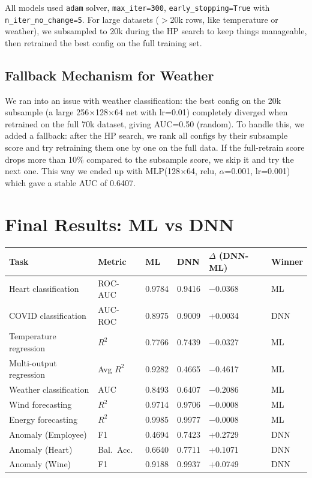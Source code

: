 \documentclass[11pt,a4paper]{article}
\begin{document}
All models used \texttt{adam} solver, \texttt{max\_iter=300}, \texttt{early\_stopping=True} with \texttt{n\_iter\_no\_change=5}.
For large datasets ($>$20k rows, like temperature or weather), we subsampled to 20k during the HP search to keep things manageable, then retrained the best config on the full training set.

\subsection{Fallback Mechanism for Weather}

We ran into an issue with weather classification: the best config on the 20k subsample (a large 256$\times$128$\times$64 net with lr=0.01) completely diverged when retrained on the full 70k dataset, giving AUC=0.50 (random).
To handle this, we added a fallback: after the HP search, we rank all configs by their subsample score and try retraining them one by one on the full data.
If the full-retrain score drops more than 10\% compared to the subsample score, we skip it and try the next one.
This way we ended up with MLP(128$\times$64, relu, $\alpha$=0.001, lr=0.001) which gave a stable AUC of 0.6407.

\section{Final Results: ML vs DNN}

\small
\begin{tabular}{p{3.1cm} p{1.2cm} p{1.5cm} p{1.5cm} p{1.5cm} p{1.0cm}}
\toprule
\textbf{Task} & \textbf{Metric} & \textbf{ML} & \textbf{DNN} & \textbf{$\Delta$ (DNN-ML)} & \textbf{Winner} \\
\midrule
Heart classification & ROC-AUC & 0.9784 & 0.9416 & $-$0.0368 & ML \\
COVID classification & AUC-ROC & 0.8975 & 0.9009 & +0.0034 & DNN \\
Temperature regression & $R^2$ & 0.7766 & 0.7439 & $-$0.0327 & ML \\
Multi-output regression & Avg $R^2$ & 0.9282 & 0.4665 & $-$0.4617 & ML \\
Weather classification & AUC & 0.8493 & 0.6407 & $-$0.2086 & ML \\
Wind forecasting & $R^2$ & 0.9714 & 0.9706 & $-$0.0008 & ML \\
Energy forecasting & $R^2$ & 0.9985 & 0.9977 & $-$0.0008 & ML \\
Anomaly (Employee) & F1 & 0.4694 & 0.7423 & +0.2729 & DNN \\
Anomaly (Heart) & Bal.\ Acc. & 0.6640 & 0.7711 & +0.1071 & DNN \\
Anomaly (Wine) & F1 & 0.9188 & 0.9937 & +0.0749 & DNN \\
\bottomrule
\end{tabular}
\end{document}
